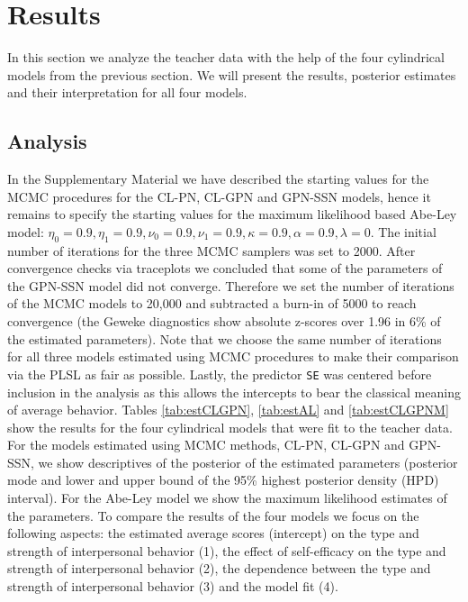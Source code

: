 \documentclass[man,mask]{apa6}
\begin{document}
\vspace{-0.75cm}
\section{Results}\label{DataAnalysis}
\vspace{-0.75cm}

In this section we analyze the teacher data with the help of the four
cylindrical models from the previous section. We will present the results,
posterior estimates and their interpretation for all four models.

\vspace{-0.75cm}
\subsection{Analysis}\label{DataResults}
\vspace{-0.75cm}

In the Supplementary Material we have described the starting values for the MCMC
procedures for the CL-PN, CL-GPN and GPN-SSN models, hence it remains to specify
the starting values for the maximum likelihood based Abe-Ley model: \(\eta_0 = 0.9, \eta_1 = 0.9, \nu_0 = 0.9, \nu_1 = 0.9, \kappa = 0.9, \alpha = 0.9, \lambda = 0\). The initial number of iterations for the three MCMC samplers was set to
2000. After convergence checks via traceplots we concluded that some of the
parameters of the GPN-SSN model did not converge. Therefore we set the number of
iterations of the MCMC models to 20,000 and subtracted a burn-in of 5000 to
reach convergence (the Geweke diagnostics show absolute z-scores over 1.96 in
6\% of the estimated parameters). Note that we choose the same number of
iterations for all three models estimated using MCMC procedures to make
their comparison via the PLSL as fair as possible. Lastly, the predictor
\verb|SE| was centered before inclusion in the analysis as this allows the
intercepts to bear the classical meaning of average behavior.\newline
\indent Tables \ref{tab:estCLGPN}, \ref{tab:estAL} and \ref{tab:estCLGPNM} show
the results for the four cylindrical models that were fit to the teacher data.
For the models estimated using MCMC methods, CL-PN, CL-GPN and GPN-SSN, we show
descriptives of the posterior of the estimated parameters (posterior mode and
lower and upper bound of the 95\% highest posterior density (HPD) interval). For
the Abe-Ley model we show the maximum likelihood estimates of the parameters. To
compare the results of the four models we focus on the following aspects: the
estimated average scores (intercept) on the type and strength of interpersonal
behavior (1), the effect of self-efficacy on the type and strength of
interpersonal behavior (2), the dependence between the type and strength of
interpersonal behavior (3) and the model fit (4).
\end{document}
